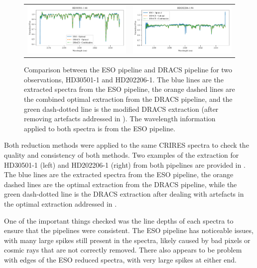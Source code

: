 \begin{figure}
\begin{tabular}{cc}
        \includegraphics[width=0.5\linewidth]{figures/reduction/pipeline_compare/pipeline_compare_HD30501-1_chip_4} & \includegraphics[width=0.5\linewidth]{figures/reduction/pipeline_compare/pipeline_compare_HD202206-1_chip_4}\\
    \end{tabular}
    \caption{Comparison between the {ESO} pipeline and {DRACS} pipeline for two observations, {HD30501-1} and {HD202206-1}.
The blue lines are the extracted spectra from the {ESO} pipeline, the orange dashed lines are the combined optimal extraction from the {DRACS} pipeline, and the green dash-dotted line is the modified {DRACS} extraction (after removing artefacts addressed in ).
The wavelength information applied to both spectra is from the {ESO} pipeline.}
    \label{fig:reduction-comparison}
\end{figure}

Both reduction methods were applied to the same {CRIRES} spectra to check the quality and consistency of both methods.
Two examples of the extraction for HD30501-1 (left) and HD202206-1 (right) from both pipelines are provided in .
The blue lines are the extracted spectra from the {ESO} pipeline, the orange dashed lines are the optimal extraction from the {DRACS} pipeline, while the green dash-dotted line is the {DRACS} extraction after dealing with artefacts in the optimal extraction addressed in .

One of the important things checked was the line depths of each spectra to ensure that the pipelines were consistent.
The {ESO} pipeline has noticeable issues, with many large spikes still present in the spectra, likely caused by bad pixels or cosmic rays that are not correctly removed.
There also appears to be problem with edges of the {ESO} reduced spectra, with very large spikes at either end.

